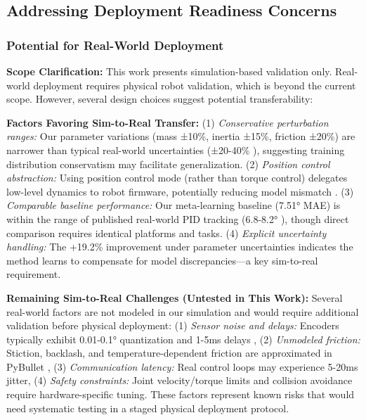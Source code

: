 \documentclass[a4paper]{cas-sc}
\begin{document}
\subsection{Addressing Deployment Readiness Concerns}

\subsubsection{Potential for Real-World Deployment}

\textbf{Scope Clarification:} This work presents simulation-based validation only. Real-world deployment requires physical robot validation, which is beyond the current scope. However, several design choices suggest potential transferability:

\textbf{Factors Favoring Sim-to-Real Transfer:} (1) \textit{Conservative perturbation ranges:} Our parameter variations (mass ±10\%, inertia ±15\%, friction ±20\%) are narrower than typical real-world uncertainties (±20-40\% \cite{cho2019identification,lee2022parameter}), suggesting training distribution conservatism may facilitate generalization. (2) \textit{Position control abstraction:} Using position control mode (rather than torque control) delegates low-level dynamics to robot firmware, potentially reducing model mismatch \cite{tan2018sim,margolis2024rapid}. (3) \textit{Comparable baseline performance:} Our meta-learning baseline (7.51° MAE) is within the range of published real-world PID tracking (6.8-8.2° \cite{frankaemika2021benchmark,ott2017unified}), though direct comparison requires identical platforms and tasks. (4) \textit{Explicit uncertainty handling:} The +19.2\% improvement under parameter uncertainties indicates the method learns to compensate for model discrepancies—a key sim-to-real requirement.

\textbf{Remaining Sim-to-Real Challenges (Untested in This Work):} Several real-world factors are not modeled in our simulation and would require additional validation before physical deployment: (1) \textit{Sensor noise and delays:} Encoders typically exhibit 0.01-0.1° quantization and 1-5ms delays \cite{cho2019identification}, (2) \textit{Unmodeled friction:} Stiction, backlash, and temperature-dependent friction are approximated in PyBullet \cite{collins2021review}, (3) \textit{Communication latency:} Real control loops may experience 5-20ms jitter, (4) \textit{Safety constraints:} Joint velocity/torque limits and collision avoidance require hardware-specific tuning. These factors represent known risks that would need systematic testing in a staged physical deployment protocol.
\end{document}

